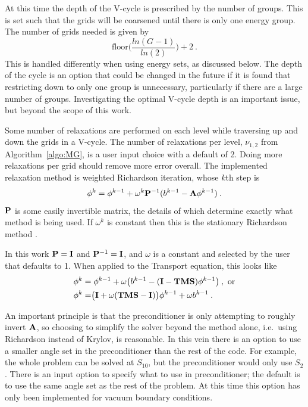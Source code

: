 At this time the depth of the V-cycle is prescribed by the number of groups. This is set such that the grids will be coarsened until there is only one energy group. The number of grids needed is given by \cite{BinaryTree2011}
\begin{equation}
  \text{floor}\bigl( \frac{ln(G-1)}{ln(2)}\bigr) + 2 \:.
  \label{eq:NumGrids}
\end{equation}
%
This is handled differently when using energy sets, as discussed below. The depth of the cycle is an option that could be changed in the future if it is found that restricting down to only one group is unnecessary, particularly if there are a large number of groups. Investigating the optimal V-cycle depth is an important issue, but beyond the scope of this work. 

Some number of relaxations are performed on each level while traversing up and down the grids in a V-cycle. The number of relaxations per level, $\nu_{1,2}$ from Algorithm~\ref{algo:MG}, is a user input choice with a default of 2. Doing more relaxations per grid should remove more error overall. The implemented relaxation method is weighted Richardson iteration, whose $k$th step is
%
\begin{equation}
  \phi^{k} = \phi^{k-1} + \omega^{k}\mathbf{P}^{-1}(b^{k-1} - \mathbf{A}\phi^{k-1}) \:.
  \label{eq:Richardson}
\end{equation}
%
$\mathbf{P}$ is some easily invertible matrix, the details of which determine exactly what method is being used. If $\omega^{k}$ is constant then this is the stationary Richardson method \cite{Moore1999}. 

In this work $\mathbf{P} = \mathbf{I}$ and $\mathbf{P}^{-1} = \mathbf{I}$, and $\omega$ is a constant and selected by the user that defaults to 1. When applied to the Transport equation, this looks like
%
\begin{align}
  \phi^{k} &= \phi^{k-1} + \omega\bigr(b^{k-1} - (\mathbf{I} - \mathbf{TMS})\phi^{k-1}\bigl) \:, \text{ or} \nonumber \\
  \phi^{k} &= \bigr(\mathbf{I} + \omega(\mathbf{TMS} - \mathbf{I})\bigl)\phi^{k-1} + \omega b^{k-1} \:.
  \label{eq:relax}
 \end{align}
  
An important principle is that the preconditioner is only attempting to roughly invert $\mathbf{A}$, so choosing to simplify the solver beyond the method alone, i.e.\ using Richardson instead of Krylov, is reasonable. In this vein there is an option to use a smaller angle set in the preconditioner than the rest of the code. For example, the whole problem can be solved at $S_{10}$, but the preconditioner would only use $S_{2}$. There is an input option to specify what to use in preconditioner; the default is to use the same angle set as the rest of the problem. At this time this option has only been implemented for vacuum boundary conditions. 

